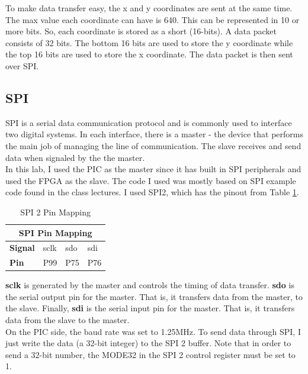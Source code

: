 \documentclass[11pt]{article}
\begin{document}
To make data transfer easy, the x and y coordinates are sent at the same time. The max value each coordinate can have is 640. This  can be represented in 10 or more bits. So, each coordinate is stored as a short (16-bits). A data packet consists of 32 bits. The bottom 16 bits are used to store the y coordinate while the top 16 bits are used to store the x coordinate. The data packet is then sent over SPI. \\

\subsection{SPI}
SPI is a serial data communication protocol and is commonly used to interface two digital systems. In each interface, there is a master - the device that performs the main job of managing the line of communication. The slave receives and send data when signaled by the the master. \\

In this lab, I used the PIC as the master since it has built in SPI peripherals and used the FPGA as the slave. The code I used was mostly based on SPI example code found in the class lectures. I used SPI2, which has the pinout from Table \ref{table:spi_pinout}.

\begin{table}[h!]
\centering
\begin{tabular}{|l|l|l|l|}
\hline
\multicolumn{4}{|c|}{\textbf{SPI Pin Mapping}} \\ \hline
\textbf{Signal}    & sclk    & sdo    & sdi    \\ \hline
\textbf{Pin}       & P99     & P75    & P76    \\ \hline
\end{tabular}
\caption{SPI 2 Pin Mapping}
\label{table:spi_pinout}
\end{table}

\textbf{sclk} is generated by the master and controls the timing of data transfer. \textbf{sdo} is the serial output pin for the master. That is, it transfers data from the master, to the slave. Finally, \textbf{sdi} is the serial input pin for the master. That is, it transfers data from the slave to the master. \\

On the PIC side, the baud rate was set to 1.25MHz. To send data through SPI, I just write the data (a 32-bit integer) to the SPI 2 buffer. Note that in order to send a 32-bit number, the MODE32 in the SPI 2 control register must be set to 1. \\
\end{document}
